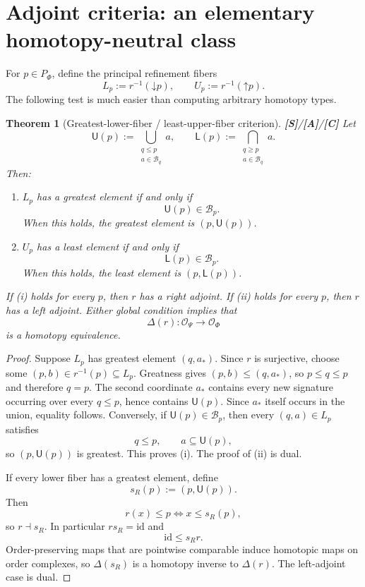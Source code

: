 \documentclass[11pt]{article}
\newtheorem{theorem}{Theorem}[section]
\theoremstyle{definition}
\newcommand{\OX}{\mathcal O}
\newcommand{\statusS}{\textbf{[S]}}
\newcommand{\statusA}{\textbf{[A]}}
\newcommand{\statusC}{\textbf{[C]}}
\newcommand{\down}{\mathord\downarrow}
\newcommand{\up}{\mathord\uparrow}
\begin{document}
\section{Adjoint criteria: an elementary homotopy-neutral class}

For \(p\in P_\Phi\), define the principal refinement fibers
\[
L_p:=r^{-1}(\down p),
\qquad
U_p:=r^{-1}(\up p).
\]
The following test is much easier than computing arbitrary homotopy types.

\begin{theorem}[Greatest-lower-fiber / least-upper-fiber criterion]\label{thm:adjoint}
\statusS/\statusA/\statusC\;
Let
\[
\mathsf U(p)
:=\bigcup_{\substack{q\le p\\a\in\mathcal B_q}}a,
\qquad
\mathsf L(p)
:=\bigcap_{\substack{q\ge p\\a\in\mathcal B_q}}a.
\]
Then:
\begin{enumerate}[label=(\roman*)]
\item \(L_p\) has a greatest element if and only if
\[
\mathsf U(p)\in\mathcal B_p.
\]
When this holds, the greatest element is \((p,\mathsf U(p))\).
\item \(U_p\) has a least element if and only if
\[
\mathsf L(p)\in\mathcal B_p.
\]
When this holds, the least element is \((p,\mathsf L(p))\).
\end{enumerate}
If (i) holds for every \(p\), then \(r\) has a right adjoint. If (ii) holds for every \(p\), then \(r\) has a left adjoint. Either global condition implies that
\[
\Delta(r):\OX_\Psi\to\OX_\Phi
\]
is a homotopy equivalence.
\end{theorem}

\begin{proof}
Suppose \(L_p\) has greatest element \((q,a_*)\). Since \(r\) is surjective, choose some \((p,b)\in r^{-1}(p)\subseteq L_p\). Greatness gives \((p,b)\le(q,a_*)\), so \(p\le q\le p\) and therefore \(q=p\). The second coordinate \(a_*\) contains every new signature occurring over every \(q\le p\), hence contains \(\mathsf U(p)\). Since \(a_*\) itself occurs in the union, equality follows. Conversely, if \(\mathsf U(p)\in\mathcal B_p\), then every \((q,a)\in L_p\) satisfies
\[
q\le p,\qquad a\subseteq\mathsf U(p),
\]
so \((p,\mathsf U(p))\) is greatest. This proves (i). The proof of (ii) is dual.

If every lower fiber has a greatest element, define
\[
s_R(p):=(p,\mathsf U(p)).
\]
Then
\[
r(x)\le p\iff x\le s_R(p),
\]
so \(r\dashv s_R\). In particular \(r s_R=\mathrm{id}\) and
\[
\mathrm{id}\le s_Rr.
\]
Order-preserving maps that are pointwise comparable induce homotopic maps on order complexes, so \(\Delta(s_R)\) is a homotopy inverse to \(\Delta(r)\). The left-adjoint case is dual.
\end{proof}
\end{document}

